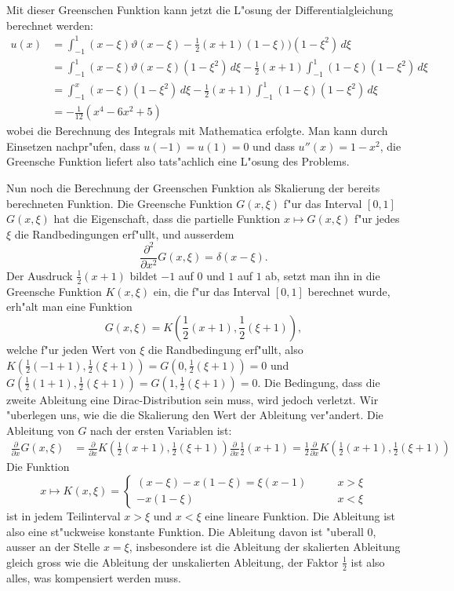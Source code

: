 \begin{loesung}
Mit dieser Greenschen Funktion kann jetzt die L"osung der
Differentialgleichung berechnet werden:
\begin{align*}
u(x)&=\int_{-1}^1
(x-\xi)\vartheta(x-\xi)-{\textstyle\frac12}(x+1)(1-\xi)
)(1-\xi^2)\,d\xi
\\
&=
\int_{-1}^1(x-\xi)\vartheta(x-\xi)(1-\xi^2)\,d\xi
-{\textstyle\frac12}(x+1)\int_{-1}^1(1-\xi)(1-\xi^2)\,d\xi
\\
&=
\int_{-1}^x(x-\xi)(1-\xi^2)\,d\xi
-{\textstyle\frac12}(x+1)\int_{-1}^1(1-\xi)(1-\xi^2)\,d\xi
\\
&=
-\frac1{12}(x^4-6x^2+5)
\end{align*}
wobei die Berechnung des Integrals mit Mathematica erfolgte.
Man kann durch Einsetzen nachpr"ufen, dass
$u(-1)=u(1)=0$ und dass $u''(x)=1-x^2$, die Greensche Funktion
liefert also tats"achlich eine L"osung des Problems.

Nun noch die Berechnung der Greenschen Funktion als Skalierung
der bereits berechneten Funktion. Die Greensche Funktion $G(x,\xi)$ f"ur
das Interval $[0,1]$
$G(x,\xi)$ hat die Eigenschaft, dass die partielle Funktion
$x\mapsto G(x,\xi)$ f"ur jedes $\xi$ die Randbedingungen erf"ullt,
und ausserdem
\[
\frac{\partial^2}{\partial x^2}G(x,\xi)=\delta(x-\xi).
\]
Der Ausdruck $\frac12(x+1)$ bildet $-1$ auf $0$ und $1$ auf $1$
ab, setzt man ihn in die Greensche Funktion $K(x,\xi)$ ein,
die f"ur das Interval $[0,1]$ berechnet wurde,
erh"alt man eine Funktion
\[
G(x,\xi)=K({\textstyle\frac12}(x+1),{\textstyle\frac12}(\xi+1)),
\]
welche
f"ur jeden Wert von $\xi$ die Randbedingung erf"ullt, also
$K(\frac12(-1+1),\frac12(\xi+1))=G(0,\frac12(\xi+1))=0$ und
$G(\frac12(1+1),\frac12(\xi+1))=G(1,\frac12(\xi+1))=0$.
Die Bedingung, dass die zweite Ableitung eine Dirac-Distribution
sein muss, wird jedoch verletzt. Wir "uberlegen uns, wie die
die Skalierung den Wert der Ableitung ver"andert.
Die Ableitung von $G$ nach der ersten Variablen ist:
\begin{align*}
\frac{\partial}{\partial x}G(x,\xi)
&=
\frac{\partial}{\partial x}K({\textstyle\frac12}(x+1),{\textstyle\frac12}(\xi+1))\frac{\partial}{\partial x}\frac12(x+1)
=
\frac12\frac{\partial }{\partial x}K({\textstyle \frac12}(x+1), {\textstyle\frac12}(\xi+1))
\end{align*}
Die Funktion
\[
x\mapsto K(x,\xi)=\begin{cases}
(x-\xi)-x(1-\xi)=\xi(x-1)&\qquad x>\xi
\\
-x(1-\xi)&\qquad x<\xi
\end{cases}
\]
ist in jedem Teilinterval $x>\xi$ und $x<\xi$ eine lineare Funktion. Die Ableitung
ist also eine st"uckweise konstante Funktion.
Die Ableitung davon ist "uberall $0$, ausser an der Stelle $x=\xi$,
insbesondere ist die Ableitung der skalierten Ableitung gleich gross
wie die Ableitung der unskalierten Ableitung, der Faktor $\frac12$ ist
also alles, was kompensiert werden muss.


\end{loesung}
